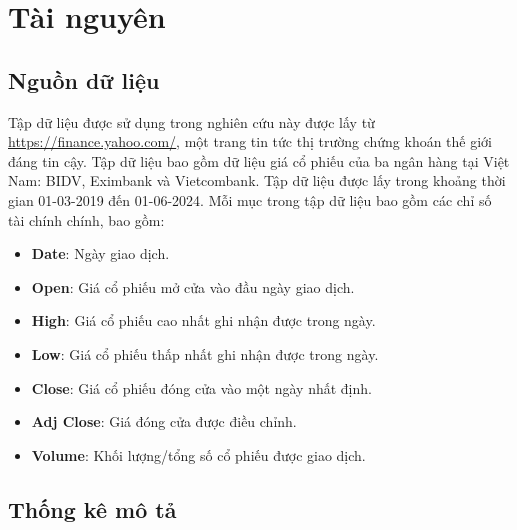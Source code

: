 \section{Tài nguyên}
\subsection{Nguồn dữ liệu}
Tập dữ liệu được sử dụng trong nghiên cứu này được lấy từ \underline{\href{https://finance.yahoo.com/}{https://finance.yahoo.com/}}, một trang tin tức thị trường chứng khoán thế giới đáng tin cậy. Tập dữ liệu bao gồm dữ liệu giá cổ phiếu của ba ngân hàng tại Việt Nam: BIDV, Eximbank và Vietcombank. Tập dữ liệu được lấy trong khoảng thời gian 01-03-2019 đến 01-06-2024. Mỗi mục trong tập dữ liệu bao gồm các chỉ số tài chính chính, bao gồm:
\begin{itemize}
\item \textbf{Date}: Ngày giao dịch.
\item \textbf{Open}: Giá cổ phiếu mở cửa vào đầu ngày giao dịch.
\item \textbf{High}: Giá cổ phiếu cao nhất ghi nhận được trong ngày.
\item \textbf{Low}: Giá cổ phiếu thấp nhất ghi nhận được trong ngày.
\item \textbf{Close}: Giá cổ phiếu đóng cửa vào một ngày nhất định.
\item \textbf{Adj Close}: Giá đóng cửa được điều chỉnh.
\item \textbf{Volume}: Khối lượng/tổng số cổ phiếu được giao dịch.
\end{itemize}
\subsection{Thống kê mô tả}

